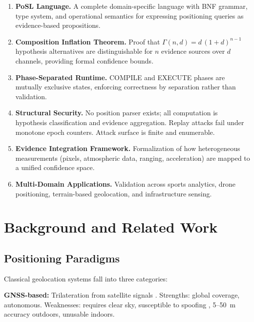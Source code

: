 \documentclass[twocolumn,10pt]{article}
\begin{document}
\begin{enumerate}[leftmargin=1.5em,topsep=2pt,itemsep=1pt]
  \item \textbf{PoSL Language.} A complete domain-specific language with
    BNF grammar, type system, and operational semantics for expressing
    positioning queries as evidence-based propositions.

  \item \textbf{Composition Inflation Theorem.} Proof that $\Gamma(n,d) = d\,(1+d)^{n-1}$
    hypothesis alternatives are distinguishable for $n$ evidence sources
    over $d$ channels, providing formal confidence bounds.

  \item \textbf{Phase-Separated Runtime.} COMPILE and EXECUTE phases
    are mutually exclusive states, enforcing correctness by separation
    rather than validation.

  \item \textbf{Structural Security.} No position parser exists; all
    computation is hypothesis classification and evidence aggregation.
    Replay attacks fail under monotone epoch counters. Attack surface
    is finite and enumerable.

  \item \textbf{Evidence Integration Framework.} Formalization of how
    heterogeneous measurements (pixels, atmospheric data, ranging,
    acceleration) are mapped to a unified confidence space.

  \item \textbf{Multi-Domain Applications.} Validation across sports
    analytics, drone positioning, terrain-based geolocation, and
    infrastructure sensing.
\end{enumerate}

\section{Background and Related Work}
\label{sec:background}

\subsection{Positioning Paradigms}

Classical geolocation systems fall into three categories:

\textbf{GNSS-based:} Trilateration from satellite signals \cite{hofmann2006inertial,raquet2010error}.
Strengths: global coverage, autonomous. Weaknesses: requires clear sky, susceptible
to spoofing \cite{raquet2010error}, 5--50~m accuracy outdoors, unusable indoors.
\end{document}
